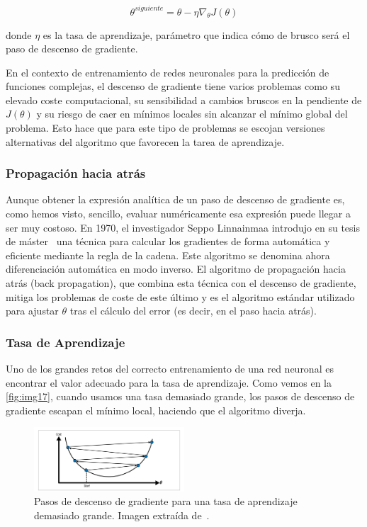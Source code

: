 \begin{equation}
    \theta^{siguiente} = \theta - \eta\nabla_{\theta}J(\theta)
\end{equation}

donde $\eta$ es la tasa de aprendizaje, parámetro que indica cómo de brusco será el paso de descenso de gradiente. 


En el contexto de entrenamiento de redes neuronales para la predicción de funciones complejas, el descenso de gradiente tiene varios problemas como su elevado coste computacional, su sensibilidad a cambios bruscos en la pendiente de $J(\theta)$ y su riesgo de caer en mínimos locales sin alcanzar el mínimo global del problema. Esto hace que para este tipo de problemas se escojan versiones alternativas del algoritmo que favorecen la tarea de aprendizaje. 


\subsubsection{Propagación hacia atrás}

Aunque obtener la expresión analítica de un paso de descenso de gradiente es, como hemos visto, sencillo, evaluar numéricamente esa expresión puede llegar a ser muy costoso. En 1970, el investigador Seppo Linnainmaa introdujo en su tesis de máster~\cite{linnainmaa1970representation} una técnica para calcular los gradientes de forma automática y eficiente mediante la regla de la cadena. Este algoritmo se denomina ahora diferenciación automática en modo inverso. El algoritmo de propagación hacia atrás (back propagation), que combina esta técnica con el descenso de gradiente, mitiga los problemas de coste de este último y es el algoritmo estándar utilizado para ajustar $\theta$ tras el cálculo del error (es decir, en el paso hacia atrás). 


\subsubsection{Tasa de Aprendizaje}

Uno de los grandes retos del correcto entrenamiento de una red neuronal es encontrar el valor adecuado para la tasa de aprendizaje. Como vemos en la \autoref{fig:img17}, cuando usamos una tasa demasiado grande, los pasos de descenso de gradiente escapan el mínimo local, haciendo que el algoritmo diverja.

 \begin{figure}[htbp]
    \centering
    \includegraphics[width=0.5\textwidth]{img/img17.png}
    \caption{Pasos de descenso de gradiente para una tasa de aprendizaje demasiado grande. Imagen extraída de~\cite{Buric2020}.}
    \label{fig:img17}
\end{figure}

